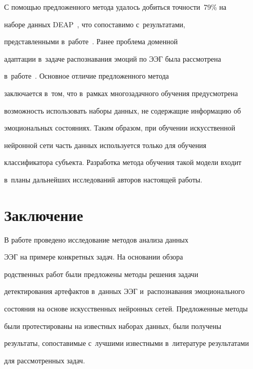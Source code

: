      

     С помощью предложенного метода удалось добиться точ\-ности~79\% на 

наборе данных DEAP~\cite{10-sha}, что сопоставимо с~результатами, 

представленными в~работе~\cite{12-sha}. Ранее проб\-ле\-ма доменной 

адаптации в~задаче распознавания эмоций по ЭЭГ была рас\-смот\-ре\-на 

в~работе~\cite{16-sha}. Основное отличие предложенного метода 

заключается в~том, что в~рамках многозадачного обучения предусмот\-ре\-на 

возможность использовать наборы данных, не содержащие информацию об 

эмоциональных со\-сто\-яни\-ях. Таким образом, при обучении искусственной 

нейронной сети часть данных используется только для обучения 

классификатора субъекта. Разработка метода обучения такой модели входит 

в~планы дальнейших исследований авторов настоящей работы.



\section{Заключение}

     

     В работе проведено исследование методов анализа данных 

ЭЭГ на примере конкретных задач. На основании обзора 

родственных работ были предложены методы решения задачи 

детектирования артефактов в~данных ЭЭГ и~распознавания эмоционального 

состояния на основе искусственных нейронных сетей. Предложенные методы 

были протестированы на известных наборах данных, были получены 

результаты, со\-по\-ста\-ви\-мые с~лучшими известными в~литературе результатами 

для рас\-смот\-рен\-ных задач. 

     

